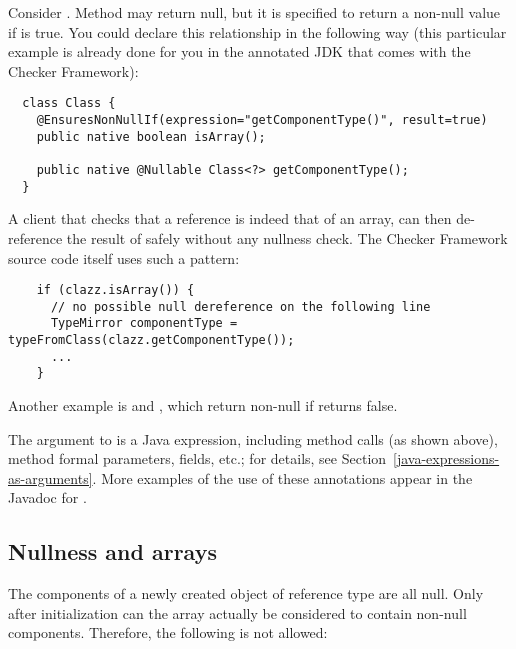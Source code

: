 Consider .
Method
may return null, but it is specified to return a non-null value if
 is
true.
You could declare this relationship in the following way (this particular
example is already
done for you in the annotated JDK that comes with the Checker Framework):

\begin{Verbatim}
  class Class {
    @EnsuresNonNullIf(expression="getComponentType()", result=true)
    public native boolean isArray();

    public native @Nullable Class<?> getComponentType();
  }
\end{Verbatim}

A client that checks that a  reference is indeed that of an array,
can then de-reference the result of  safely
without any nullness check.  The Checker Framework source code itself
uses such a pattern:

\begin{Verbatim}
    if (clazz.isArray()) {
      // no possible null dereference on the following line
      TypeMirror componentType = typeFromClass(clazz.getComponentType());
      ...
    }
\end{Verbatim}

Another example is 
and , which return
non-null if 
returns false.

The argument to  is a Java expression, including method calls
(as shown above), method formal parameters, fields, etc.; for details, see
Section~\ref{java-expressions-as-arguments}.
More examples of the use of these annotations appear in the Javadoc for
.


\subsection{Nullness and arrays\label{nullness-arrays}}

The components of a newly created object of reference type are all
null. Only after initialization can the array actually be considered
to contain non-null components.
Therefore, the following is not allowed:

